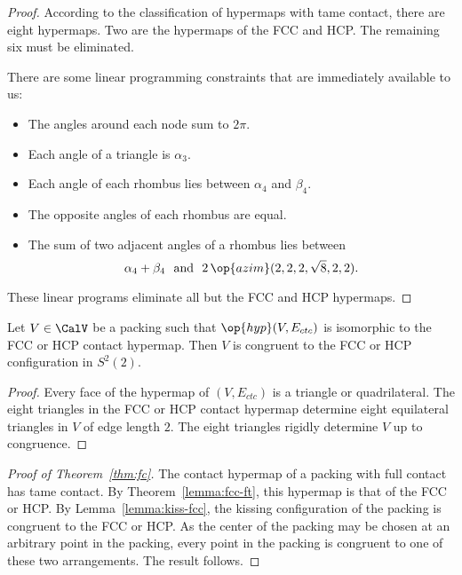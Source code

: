 \begin{proof} According to the classification of hypermaps with tame
  contact, there are eight hypermaps.  Two are the hypermaps of the
  FCC and HCP.  The remaining six must be eliminated.

There are some linear
  programming constraints that are immediately available to us:
\begin{itemize}
\item The angles around each node sum to $2\pi$.
\item Each angle of a triangle is $\alpha_3$.
\item Each angle of each rhombus lies between $\alpha_4$ and $\beta_4$.
\item The opposite angles of each rhombus are equal.
\item The sum of two adjacent angles of a rhombus lies between
\[
  \alpha_4 + \beta_4 \text{~~and~~} 2\,\op{azim}(2,2,2,\sqrt8,2,2).
\]
\end{itemize}
These linear programs eliminate all but the FCC and HCP hypermaps.
\end{proof}


\begin{lemma}[]\label{lemma:kiss-fcc}
  Let $V\in \CalV$ be a packing such that $\op{hyp}(V,E_{ctc})$ is
  isomorphic to the FCC or HCP contact hypermap.  Then $V$ is
  congruent to the FCC or HCP configuration in $S^2(2)$.
\end{lemma}
%
%
%
%
%

\begin{proof} Every face of the hypermap of $(V,E_{ctc})$ is a
  triangle or quadrilateral.  The eight triangles in the FCC or HCP
  contact hypermap determine eight equilateral triangles in $V$ of
  edge length $2$.  The eight triangles rigidly determine $V$ up to
  congruence.
\end{proof}

\begin{proof}[Proof of Theorem~\ref{thm:fc}]  %
  The contact hypermap of a packing with full contact has tame
  contact.  By Theorem~\ref{lemma:fcc-ft}, this hypermap is that of
  the FCC or HCP.  By Lemma~\ref{lemma:kiss-fcc}, the kissing
  configuration of the packing is congruent to the FCC or HCP.  As the
  center of the packing may be chosen at an arbitrary point in the
  packing, every point in the packing is congruent to one of these two
  arrangements.  The result follows.
\end{proof}



